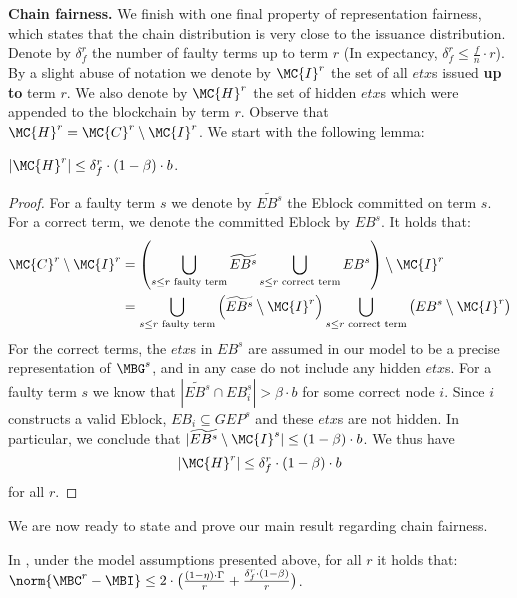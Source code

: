 \textbf{Chain fairness.}
We finish with one final property of representation fairness, which states that the chain distribution is very close to the issuance distribution. Denote by $\delta_f^r$ the number of faulty terms up to term $r$ (In expectancy, $\delta_f^r \leq \frac{f}{n}\cdot r$). By a slight abuse of notation we denote by $\MC{I}^r$ the set of all $etx$s issued \textbf{up to} term $r$. We also denote by $\MC{H}^r$ the set of hidden $etx$s which were appended to the blockchain by term $r$. Observe that $\MC{H}^r=\MC{C}^r\setminus \MC{I}^r$. We start with the following lemma:
\begin{lemma} \label{lemma:hidden}
	$|\MC{H}^r|\leq \delta_f^r \cdot (1-\beta)\cdot b$.
\end{lemma}
\begin{proof}
For a faulty term $s$ we denote by $\widetilde{EB^s}$ the Eblock committed on term $s$. For a correct term, we denote the committed Eblock by $EB^s$. It holds that:
\begin{align}
\MC{C}^r\setminus \MC{I}^r &= \left(\bigcup_{s\leq r \text{ faulty term}}\widetilde{EB^s} \bigcup_{s\leq r \text{ correct term}} EB^s\right)\mathbin{\big\backslash} \MC{I}^r \nonumber \\
&= \bigcup_{s\leq r \text{ faulty term}} \left (\widetilde{EB^s} \mathbin{\big\backslash} \MC{I}^r \right ) \bigcup_{s\leq r \text{ correct term}} \left (EB^s \mathbin{\big\backslash} \MC{I}^r \right )\label{eq:rep_e}
\end{align}
For the correct terms, the $etx$s in $EB^s$ are assumed in our model to be a precise representation of $\MBG^s$, and in any case do not include any hidden $etx$s. For a faulty term $s$ we know that $|\widetilde{EB^s}\cap EB^s_i|>\beta\cdot b$ for some correct node $i$. Since $i$ constructs a valid Eblock, $EB_i\subseteq GEP^s$ and these $etx$s are not hidden. In particular, we conclude that $|\widetilde{EB^s}\setminus \MC{I}^s|\leq (1-\beta)\cdot b$. We thus have 
$$|\MC{H}^r| \leq \delta_f^r \cdot (1-\beta)\cdot b$$  for all $r$.
\end{proof}
We are now ready to state and prove our main result regarding chain fairness.
\begin{claim}
In \nameNS, under the model assumptions presented above, for all $r$ it holds that: $\norm{\MBC^r-\MBI} \leq 2\cdot\big(\frac{(1-\eta)\cdot\Gamma}{r}+\frac{\delta_f^r\cdot (1-\beta)}{r}\big)$.
\end{claim}
\noindent 

